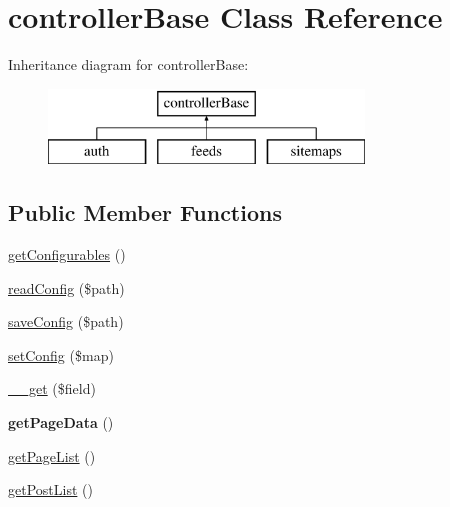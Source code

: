 \hypertarget{classcontrollerBase}{\section{controller\-Base Class Reference}
\label{classcontrollerBase}
}
Inheritance diagram for controller\-Base\-:\begin{figure}[H]
\begin{center}
\leavevmode
\includegraphics[height=2.000000cm]{classcontrollerBase}
\end{center}
\end{figure}
\subsection*{Public Member Functions}
\begin{DoxyCompactItemize}
\item 
\hyperlink{classcontrollerBase_ae1c781bb291de75ae5c75e43eea330f7}{get\-Configurables} ()
\item 
\hyperlink{classcontrollerBase_a068a70d520851aa162000a8bd00297d5}{read\-Config} (\$path)
\item 
\hyperlink{classcontrollerBase_a4fa915508685dfad4b2d693e422964c6}{save\-Config} (\$path)
\item 
\hyperlink{classcontrollerBase_ad693fea92fcf36b3a0acc76af4737325}{set\-Config} (\$map)
\item 
\hyperlink{classcontrollerBase_a353caf2d97db43daa849789fbc537064}{\-\_\-\-\_\-get} (\$field)
\item 
\hypertarget{classcontrollerBase_a0eceb6ce6c6eb1571d61636a23d2c359}{{\bfseries get\-Page\-Data} ()}\label{classcontrollerBase_a0eceb6ce6c6eb1571d61636a23d2c359}

\item 
\hyperlink{classcontrollerBase_ace536493c426391e6aa5180e6241bfe8}{get\-Page\-List} ()
\item 
\hyperlink{classcontrollerBase_a7337fee0ebcc20b3aaf98b88fbc72a44}{get\-Post\-List} ()
\end{DoxyCompactItemize}
